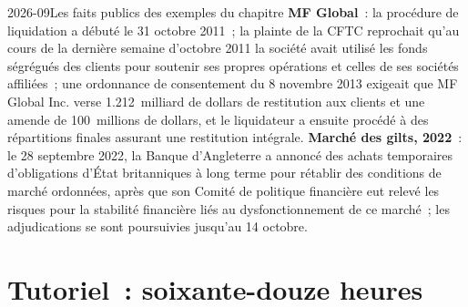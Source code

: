 \begin{dated}{2026-09}{Les faits publics des exemples du chapitre}\label{dat:fm:crisis-management:record}
\textbf{MF Global}~: la procédure de liquidation a débuté le 31 octobre 2011~; la plainte de la CFTC reprochait qu'au cours de la dernière semaine d'octobre 2011 la société
avait utilisé les fonds ségrégués des clients pour soutenir ses propres opérations et celles de ses sociétés affiliées~; une ordonnance de consentement du 8 novembre 2013 exigeait que MF Global Inc. verse
1.212~milliard de dollars de restitution aux clients et une amende de 100~millions de dollars, et le liquidateur a ensuite procédé à des répartitions finales assurant une
restitution intégrale. \textbf{Marché des gilts, 2022}~: le 28 septembre 2022, la Banque d'Angleterre a annoncé des achats temporaires d'obligations d'État britanniques à long terme
pour rétablir des conditions de marché ordonnées, après que son Comité de politique financière eut relevé les risques pour la stabilité financière liés au dysfonctionnement de ce marché~;
les adjudications se sont poursuivies jusqu'au 14 octobre.
\end{dated}

\section{Tutoriel~: soixante-douze heures}\label{tut:fm:crisis-management:tut}

